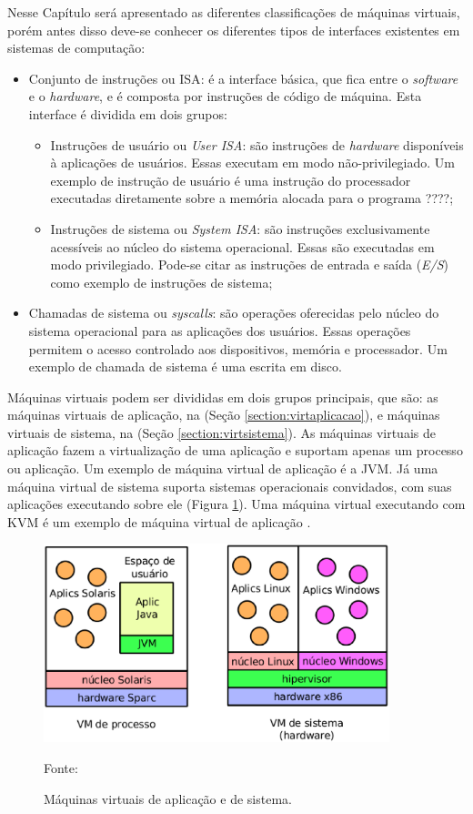 Nesse Capítulo será apresentado as diferentes classificações de máquinas virtuais, porém antes disso deve-se conhecer os diferentes 
tipos de interfaces existentes em sistemas de computação:
\begin{itemize}
 \item Conjunto de instruções ou \ac{ISA}: é a interface básica, que fica entre o \textit{software} e o \textit{hardware}, e é composta por 
 instruções de código de máquina. Esta interface é dividida em dois grupos:
 \begin{itemize}
  \item Instruções de usuário ou \textit{User \ac{ISA}}: são instruções de \textit{hardware} disponíveis à aplicações de usuários. Essas 
  executam em modo não-privilegiado. Um exemplo de instrução de usuário é uma instrução do processador executadas diretamente sobre a memória
  alocada para o programa ????;
  \item Instruções de sistema ou \textit{System \ac{ISA}}: são instruções exclusivamente acessíveis ao núcleo do sistema operacional. 
  Essas são executadas em modo privilegiado. Pode-se citar as instruções de entrada e saída (\textit{E/S}) como exemplo de instruções de sistema;
 \end{itemize}
 \item Chamadas de sistema ou \textit{syscalls}: são operações oferecidas pelo núcleo do sistema operacional para as aplicações dos usuários.
 Essas operações permitem o acesso controlado aos dispositivos, memória e processador. Um exemplo de chamada de sistema é uma escrita em disco.
\end{itemize}

Máquinas virtuais podem ser divididas em dois grupos principais, que são: as máquinas virtuais de aplicação, na (Seção \ref{section:virtaplicacao}), 
e máquinas virtuais de sistema, na (Seção \ref{section:virtsistema}). As máquinas virtuais de aplicação fazem a virtualização de uma 
aplicação e suportam apenas um processo ou aplicação. Um exemplo de máquina virtual de aplicação é a \ac{JVM}. Já uma máquina virtual de 
sistema suporta sistemas operacionais convidados, com suas aplicações executando sobre ele (Figura \ref{fig:vms_tipos}). Uma máquina virtual 
executando com \ac{KVM} é um exemplo de máquina virtual de aplicação \cite{laureano2008}.

\begin{figure}[vms_tipos]
 \centering
 \includegraphics[width=380px]{img/vms_tipos.eps}
 \caption{Máquinas virtuais de aplicação e de sistema.}
 \label{fig:vms_tipos}
 Fonte: \citet{laureano2008}
\end{figure}

